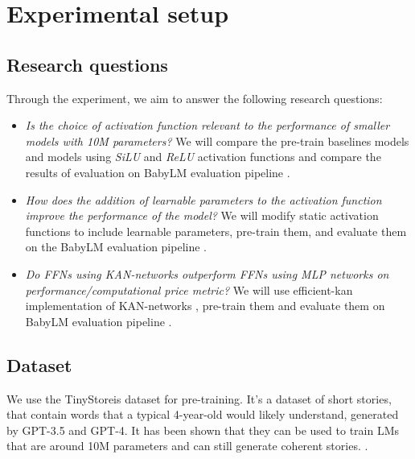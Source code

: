 
\section{Experimental setup}

\subsection{Research questions}
Through the experiment, we aim to answer the following research questions:
\begin{itemize}
    \item \textit{Is the choice of activation function relevant to the performance of smaller models with 10M parameters?}  We will compare the pre-train baselines models and models using \textit{SiLU} and \textit{ReLU} activation functions and compare the results of evaluation on BabyLM evaluation pipeline \cite{Warstadt2023}.
    \item \textit{How does the addition of learnable parameters to the activation function improve the performance of the model?} We will modify static activation functions to include learnable parameters, pre-train them, and evaluate them on the BabyLM evaluation pipeline \cite{Warstadt2023}.
    \item \textit{Do FFNs using KAN-networks outperform FFNs using MLP networks on performance/computational price metric?} We will use efficient-kan implementation of KAN-networks \cite{efficient-kan}, pre-train them and evaluate them on BabyLM evaluation pipeline \cite{Warstadt2023}.
\end{itemize}

\subsection{Dataset}
We use the TinyStoreis dataset for pre-training. It's a dataset of short stories, that contain words that a typical 4-year-old would likely understand, generated by GPT-3.5 and GPT-4. It has been shown that they can be used to train LMs that are around 10M parameters and can still generate coherent stories. \cite{Eldan2023}.

